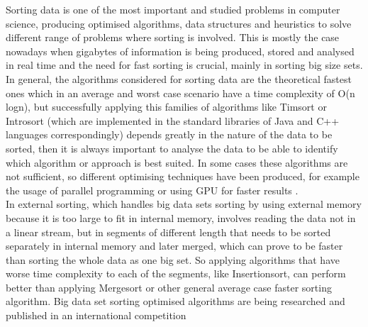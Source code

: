 \documentclass[a4paper,12pt]{article}
\begin{document}
Sorting data is one of the most important and studied problems in computer science, producing optimised algorithms, data structures and heuristics to solve different range of problems where sorting is involved. This is mostly the case nowadays when gigabytes of information is being produced, stored and analysed in real time and the need for fast sorting is crucial, mainly in sorting big size sets. In general, the algorithms considered for sorting data are the theoretical fastest ones which in an average and worst case scenario have a time complexity of O(n logn), but successfully applying this families of algorithms like Timsort\cite{Timsort} or Introsort\cite{musser1997introspective} (which are implemented in the standard libraries of Java and C++ languages correspondingly) depends greatly in the nature of the data to be sorted, then it is always important to analyse the data to be able to identify which algorithm or approach is best suited. In some cases these algorithms are not sufficient, so different optimising techniques have been produced, for example the usage of parallel programming or using GPU for faster results \cite{satish2009designing}. \\ 

In external sorting, which handles big data sets sorting by using external memory because it is too large to fit in internal memory, involves reading the data not in a linear stream, but in segments of different length that needs to be sorted separately in internal memory and later merged, which can prove to be faster than sorting the whole data as one big set. So applying algorithms that have worse time complexity to each of the segments, like Insertionsort, can perform better than applying Mergesort or other general average case faster sorting algorithm. Big data set sorting optimised algorithms are being researched and published in an international competition \cite{SortBenchmark} \\
\\
\end{document}
